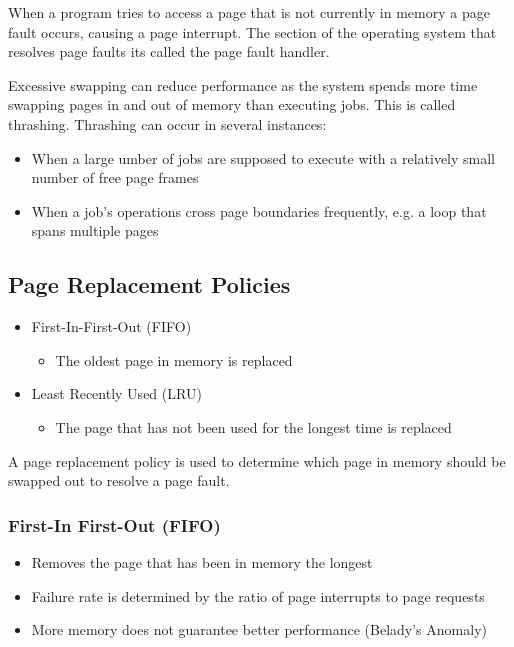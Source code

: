 \documentclass[12pt letter]{report}
\begin{document}

When a program tries to access a page that is not currently in memory a page fault occurs, causing a page interrupt. The section of the operating system that resolves page faults its called the page fault handler.

Excessive swapping can reduce performance as the system spends more time swapping pages in and out of memory than executing jobs. This is called thrashing. Thrashing can occur in several instances:
\begin{itemize}
  \item When a large umber of jobs are supposed to execute with a relatively small number of free page frames
  \item When a job's operations cross page boundaries frequently, e.g. a loop that spans multiple pages
\end{itemize}


\subsection{Page Replacement Policies}
\begin{itemize}
  \item First-In-First-Out (FIFO)
        \begin{itemize}
          \item The oldest page in memory is replaced
        \end{itemize}
  \item Least Recently Used (LRU)
        \begin{itemize}
          \item The page that has not been used for the longest time is replaced
        \end{itemize}
\end{itemize}

A page replacement policy is used to determine which page in memory should be swapped out to resolve a page fault.

\subsubsection{First-In First-Out (FIFO)}
\begin{itemize}
  \item Removes the page that has been in memory the longest
  \item Failure rate is determined by the ratio of page interrupts to page requests
  \item More memory does not guarantee better performance (Belady's Anomaly)
\end{itemize}
\end{document}
